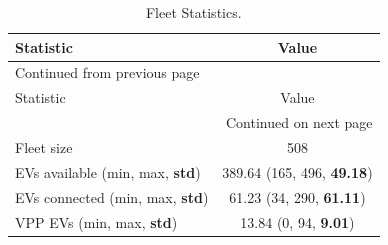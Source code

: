 \documentclass[a4paper, 12pt]{article}
\begin{document}
\begin{longtable}{l|c}
\caption[Fleet Statistics]{Fleet Statistics. \label{table-sim-stats}}
\\
\hline
\hline
Statistic & Value\\
\hline
\endfirsthead
\multicolumn{2}{l}{Continued from previous page} \\
\hline

Statistic & Value \\

\hline
\endhead
\hline\multicolumn{2}{r}{Continued on next page} \\
\endfoot
\endlastfoot
\hline
Fleet size & 508\\
EVs available (min, max, \textbf{std}) & 389.64 (165, 496, \textbf{49.18})\\
EVs connected (min, max, \textbf{std}) & 61.23 (34, 290, \textbf{61.11})\\
VPP EVs (min, max, \textbf{std}) & 13.84 (0, 94, \textbf{9.01})\\
\hline
\hline
\end{longtable}
\end{document}
